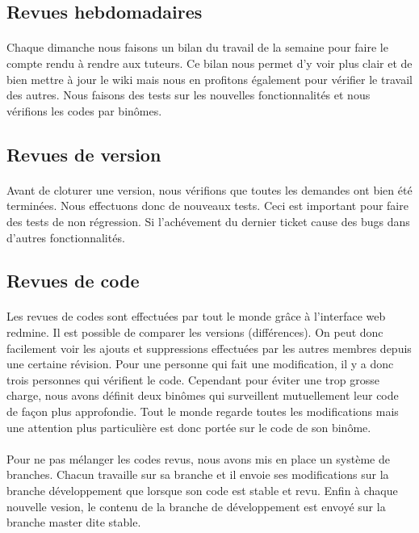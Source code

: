 \subsection{Revues hebdomadaires}

\paragraph{}
Chaque dimanche nous faisons un bilan du travail de la semaine pour faire le compte rendu à rendre aux tuteurs. Ce bilan nous permet d'y voir plus clair et de bien mettre à jour le wiki mais nous en profitons également pour vérifier le travail des autres. Nous faisons des tests sur les nouvelles fonctionnalités et nous vérifions les codes par binômes.

\subsection{Revues de version}

\paragraph{}
Avant de cloturer une version, nous vérifions que toutes les demandes ont bien été terminées. Nous effectuons donc de nouveaux tests. Ceci est important pour faire des tests de non régression. Si l'achévement du dernier ticket cause des bugs dans d'autres fonctionnalités.

\subsection{Revues de code}

\paragraph{}
Les revues de codes sont effectuées par tout le monde grâce à l'interface web redmine. Il est possible de comparer les versions (différences). On peut donc facilement voir les ajouts et suppressions effectuées par les autres membres depuis une certaine révision. Pour une personne qui fait une modification, il y a donc trois personnes qui vérifient le code. Cependant pour éviter une trop grosse charge, nous avons définit deux binômes qui surveillent mutuellement leur code de façon plus approfondie. Tout le monde regarde toutes les modifications mais une attention plus particulière est donc portée sur le code de son binôme.

\paragraph{}
Pour ne pas mélanger les codes revus, nous avons mis en place un système de branches. Chacun travaille sur sa branche et il envoie ses modifications sur la branche développement que lorsque son code est stable et revu. Enfin à chaque nouvelle vesion, le contenu de la branche de développement est envoyé sur la branche master dite stable.
